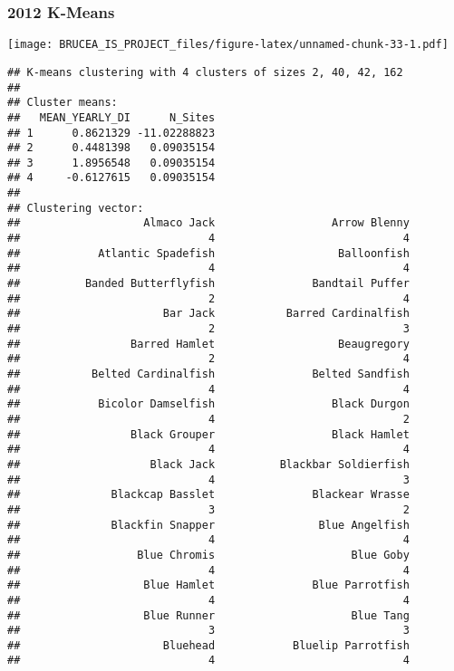 \documentclass[
]{article}
\begin{document}
\hypertarget{k-means-7}{%
\subsubsection{2012 K-Means}\label{k-means-7}}

\texttt{[image: BRUCEA\_IS\_PROJECT\_files/figure-latex/unnamed-chunk-33-1.pdf]}

\begin{verbatim}
## K-means clustering with 4 clusters of sizes 2, 40, 42, 162
## 
## Cluster means:
##   MEAN_YEARLY_DI      N_Sites
## 1      0.8621329 -11.02288823
## 2      0.4481398   0.09035154
## 3      1.8956548   0.09035154
## 4     -0.6127615   0.09035154
## 
## Clustering vector:
##                   Almaco Jack                  Arrow Blenny 
##                             4                             4 
##            Atlantic Spadefish                   Balloonfish 
##                             4                             4 
##          Banded Butterflyfish               Bandtail Puffer 
##                             2                             4 
##                      Bar Jack           Barred Cardinalfish 
##                             2                             3 
##                 Barred Hamlet                   Beaugregory 
##                             2                             4 
##           Belted Cardinalfish               Belted Sandfish 
##                             4                             4 
##            Bicolor Damselfish                  Black Durgon 
##                             4                             2 
##                 Black Grouper                  Black Hamlet 
##                             4                             4 
##                    Black Jack          Blackbar Soldierfish 
##                             4                             3 
##              Blackcap Basslet               Blackear Wrasse 
##                             3                             2 
##              Blackfin Snapper                Blue Angelfish 
##                             4                             4 
##                  Blue Chromis                     Blue Goby 
##                             4                             4 
##                   Blue Hamlet               Blue Parrotfish 
##                             4                             4 
##                   Blue Runner                     Blue Tang 
##                             3                             3 
##                      Bluehead            Bluelip Parrotfish 
##                             4                             4 

\end{verbatim}
\end{document}
